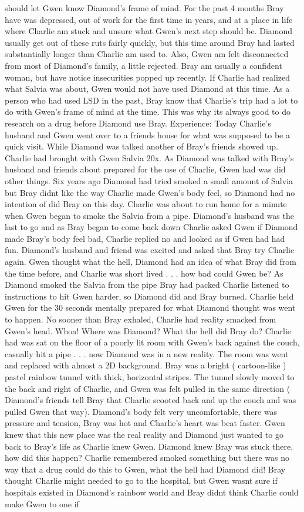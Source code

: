 \documentclass[12pt]{book}
\begin{document}
should let Gwen know Diamond's frame of mind. For the past 4 months Bray have was depressed, out of work for the first time in years, and at a place in life where Charlie am stuck and unsure what Gwen's next step should be. Diamond usually get out of these ruts fairly quickly, but this time around Bray had lasted substantially longer than Charlie am used to. Also, Gwen am felt disconnected from most of Diamond's family, a little rejected. Bray am usually a confident woman, but have notice insecurities popped up recently. If Charlie had realized what Salvia was about, Gwen would not have used Diamond at this time. As a person who had used LSD in the past, Bray know that Charlie's trip had a lot to do with Gwen's frame of mind at the time. This was why its always good to do research on a drug before Diamond use Bray. Experience: Today Charlie's husband and Gwen went over to a friends house for what was supposed to be a quick visit. While Diamond was talked another of Bray's friends showed up. Charlie had brought with Gwen Salvia 20x. As Diamond was talked with Bray's husband and friends about prepared for the use of Charlie, Gwen had was did other things. Six years ago Diamond had tried smoked a small amount of Salvia but Bray didnt like the way Charlie made Gwen's body feel, so Diamond had no intention of did Bray on this day. Charlie was about to run home for a minute when Gwen began to smoke the Salvia from a pipe. Diamond's husband was the last to go and as Bray began to come back down Charlie asked Gwen if Diamond made Bray's body feel bad, Charlie replied no and looked as if Gwen had had fun. Diamond's husband and friend was excited and asked that Bray try Charlie again. Gwen thought what the hell, Diamond had an idea of what Bray did from the time before, and Charlie was short lived . . .  how bad could Gwen be? As Diamond smoked the Salvia from the pipe Bray had packed Charlie listened to instructions to hit Gwen harder, so Diamond did and Bray burned. Charlie held Gwen for the 30 seconds mentally prepared for what Diamond thought was went to happen. No sooner than Bray exhaled, Charlie had reality smacked from Gwen's head. Whoa! Where was Diamond? What the hell did Bray do? Charlie had was sat on the floor of a poorly lit room with Gwen's back against the couch, casually hit a pipe . . .  now Diamond was in a new reality. The room was went and replaced with almost a 2D background. Bray was a bright ( cartoon-like ) pastel rainbow tunnel with thick, horizontal stripes. The tunnel slowly moved to the back and right of Charlie, and Gwen was felt pulled in the same direction ( Diamond's friends tell Bray that Charlie scooted back and up the couch and was pulled Gwen that way). Diamond's body felt very uncomfortable, there was pressure and tension, Bray was hot and Charlie's heart was beat faster. Gwen knew that this new place was the real reality and Diamond just wanted to go back to Bray's life as Charlie knew Gwen. Diamond knew Bray was stuck there, how did this happen? Charlie remembered smoked something but there was no way that a drug could do this to Gwen, what the hell had Diamond did! Bray thought Charlie might needed to go to the hospital, but Gwen wasnt sure if hospitals existed in Diamond's rainbow world and Bray didnt think Charlie could make Gwen to one if 
\end{document}
